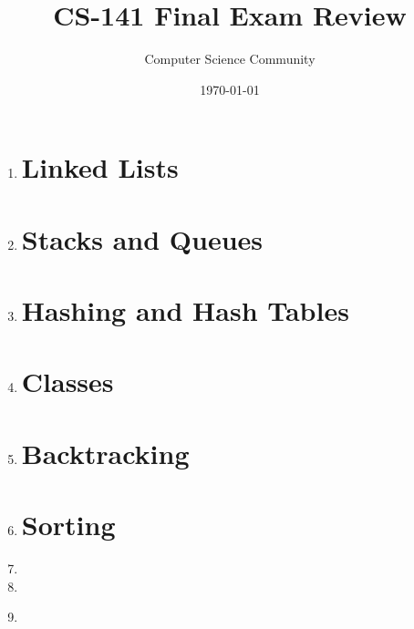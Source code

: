 \documentclass[11pt]{article}
\author{Computer Science Community}
\title{CS-141 Final Exam Review}
\date{\today}
\begin{document}
\header

\begin{enumerate}

\section*{Recursion}
	\item 

\pagebreak
\section*{Linked Lists}
    \item 

\pagebreak
\section*{Stacks and Queues}
	\item 

\pagebreak
\section*{Hashing and Hash Tables}
	\item 

\section*{Classes}
	\item 
	
\section*{Backtracking}
	\item 

\newpage
\section*{Sorting}
	\item 

	\item 

	\item \label{qsort-worst-case} 


\end{enumerate}
\end{document}
